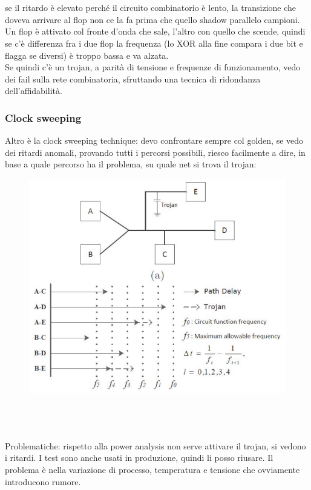 \documentclass[oneside, 12pt]{extbook}
\begin{document}
\\\\se il ritardo è elevato perché il circuito combinatorio è lento, la transizione che doveva arrivare al flop non ce la fa prima che quello shadow parallelo campioni.
\\Un flop è attivato col fronte d'onda che sale, l'altro con quello che scende, quindi se c'è differenza fra i due flop la frequenza (lo XOR alla fine compara i due bit e flagga se diversi) è troppo bassa e va alzata.
\\Se quindi c'è un trojan, a parità di tensione e frequenze di funzionamento, vedo dei fail sulla rete combinatoria, sfruttando una tecnica di ridondanza dell'affidabilità.

\subsubsection{Clock sweeping}
Altro è la clock sweeping technique: devo confrontare sempre col golden, se vedo dei ritardi anomali, provando tutti i percorsi possibili, riesco facilmente a dire, in base a quale percorso ha il problema, su quale net si trova il trojan:\\
\begin{figure}[!h]
	\includegraphics[scale=0.3]{immagini/hardware/clock_sweeping.png}
\end{figure}
\\\\
\\Problematiche: rispetto alla power analysis non serve attivare il trojan, si vedono i ritardi. I test sono anche usati in produzione, quindi li posso riusare. Il problema è nella variazione di processo, temperatura e tensione che ovviamente introducono rumore.
\end{document}
